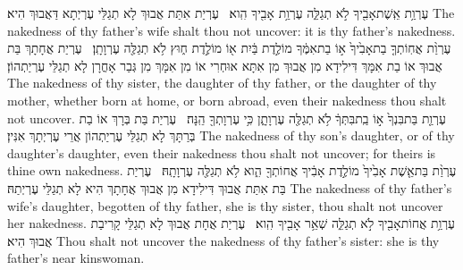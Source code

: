 {עֶרְוַ֥ת אֵֽשֶׁת\maqqaf אָבִ֖יךָ לֹ֣א תְגַלֵּ֑ה עֶרְוַ֥ת אָבִ֖יךָ הִֽוא׃ \setuma }
{עֶרְיַת אִתַּת אֲבוּךְ לָא תְגַלֵּי עֶרְיְתָא דַּאֲבוּךְ הִיא׃}
{The nakedness of thy father’s wife shalt thou not uncover: it is thy father’s nakedness.}{}
{עֶרְוַ֨ת אֲחֽוֹתְךָ֤ בַת\maqqaf אָבִ֙יךָ֙ א֣וֹ בַת\maqqaf אִמֶּ֔ךָ מוֹלֶ֣דֶת בַּ֔יִת א֖וֹ מוֹלֶ֣דֶת ח֑וּץ לֹ֥א תְגַלֶּ֖ה עֶרְוָתָֽן׃ \setuma }
{עֶרְיַת אֲחָתָךְ בַּת אֲבוּךְ אוֹ בַת אִמָּךְ דִּילִידָא מִן אֲבוּךְ מִן אִתָּא אוּחְרִי אוֹ מִן אִמָּךְ מִן גְּבַר אָחֳרָן לָא תְגַלֵּי עֶרְיַתְהוֹן׃}
{The nakedness of thy sister, the daughter of thy father, or the daughter of thy mother, whether born at home, or born abroad, even their nakedness thou shalt not uncover.}{}
{עֶרְוַ֤ת בַּת\maqqaf בִּנְךָ֙ א֣וֹ בַֽת\maqqaf בִּתְּךָ֔ לֹ֥א תְגַלֶּ֖ה עֶרְוָתָ֑ן כִּ֥י עֶרְוָתְךָ֖ הֵֽנָּה׃ \setuma }
{עֶרְיַת בַּת בְּרָךְ אוֹ בַת בְּרַתָּךְ לָא תְגַלֵּי עֶרְיַתְהוֹן אֲרֵי עֶרְיְתָךְ אִנִּין׃}
{The nakedness of thy son’s daughter, or of thy daughter’s daughter, even their nakedness thou shalt not uncover; for theirs is thine own nakedness.}{}
{עֶרְוַ֨ת בַּת\maqqaf אֵ֤שֶׁת אָבִ֙יךָ֙ מוֹלֶ֣דֶת אָבִ֔יךָ אֲחוֹתְךָ֖ הִ֑וא לֹ֥א תְגַלֶּ֖ה עֶרְוָתָֽהּ׃ \setuma }
{עֶרְיַת בַּת אִתַּת אֲבוּךְ דִּילִידָא מִן אֲבוּךְ אֲחָתָךְ הִיא לָא תְגַלֵּי עֶרְיְתַהּ׃}
{The nakedness of thy father’s wife’s daughter, begotten of thy father, she is thy sister, thou shalt not uncover her nakedness.}{}
{עֶרְוַ֥ת אֲחוֹת\maqqaf אָבִ֖יךָ לֹ֣א תְגַלֵּ֑ה שְׁאֵ֥ר אָבִ֖יךָ הִֽוא׃ \setuma }
{עֶרְיַת אֲחָת אֲבוּךְ לָא תְגַלֵּי קָרִיבַת אֲבוּךְ הִיא׃}
{Thou shalt not uncover the nakedness of thy father’s sister: she is thy father’s near kinswoman.}{}

